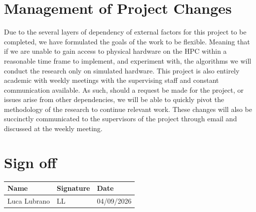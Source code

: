 \documentclass[11pt, a4paper]{article}
\begin{document}
	\section{Management of Project Changes}
	Due to the several layers of dependency of external factors for this project to be completed, we have formulated the goals of the work to be flexible. Meaning that if we are unable to gain access to physical hardware on the HPC within a reasonable time frame to implement, and experiment with, the algorithms we will conduct the research only on simulated hardware. This project is also entirely academic with weekly meetings with the supervising staff and constant communication available. As such, should a request be made for the project, or issues arise from other dependencies, we will be able to quickly pivot the methodology of the research to continue relevant work. These changes will also be succinctly communicated to the supervisors of the project through email and discussed at the weekly meeting.
	
	\vfill
	\section*{Sign off}
	\begin{tabularx}{\textwidth}{X|X|X}
	Name & Signature & Date \\\hline
	Luca Lubrano & LL & 04/09/2026\\\hline
	\end{tabularx}
	\vspace{5mm}
	\appendix
	\newpage
	
	\newpage
\end{document}
